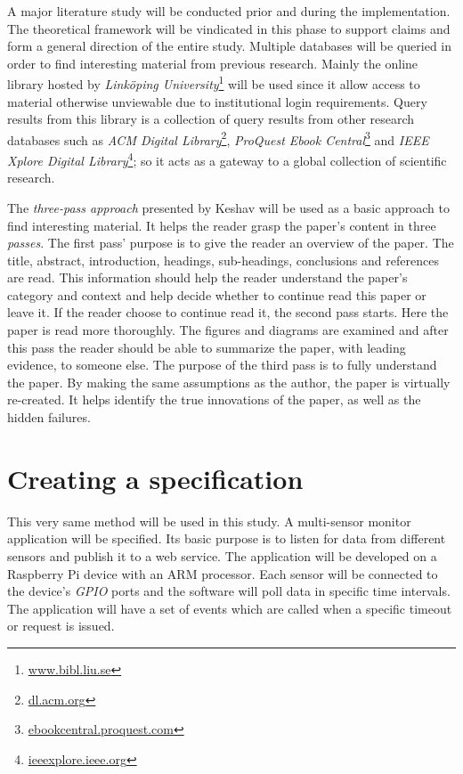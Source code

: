 A major literature study will be conducted prior and during the implementation.
The theoretical framework will be vindicated in this phase to support claims
and form a general direction of the entire study. Multiple databases will be
queried in order to find interesting material from previous research. Mainly
the online library hosted by \textit{Linköping
University}\footnote{\url{www.bibl.liu.se}} will be used since it allow access
to material otherwise unviewable due to institutional login requirements. Query
results from this library is a collection of query results from other research
databases such as \textit{ACM Digital Library}\footnote{\url{dl.acm.org}},
\textit{ProQuest Ebook Central}\footnote{\url{ebookcentral.proquest.com}} and
\textit{IEEE Xplore Digital Library}\footnote{\url{ieeexplore.ieee.org}}; so it
acts as a gateway to a global collection of scientific research.

The \textit{three-pass approach} presented by Keshav \cite{keshav2007read} will
be used as a basic approach to find interesting material. It helps the reader
grasp the paper's content in three \textit{passes}. The first pass' purpose is
to give the reader an overview of the paper. The title, abstract, introduction,
headings, sub-headings, conclusions and references are read. This information
should help the reader understand the paper's category and context and help
decide whether to continue read this paper or leave it. If the reader choose to
continue read it, the second pass starts. Here the paper is read more
thoroughly. The figures and diagrams are examined and after this pass the
reader should be able to summarize the paper, with leading evidence, to someone
else. The purpose of the third pass is to fully understand the paper. By making
the same assumptions as the author, the paper is virtually re-created. It helps
identify the true innovations of the paper, as well as the hidden failures.

\section{Creating a specification}

This very same method will be used in this study. A multi-sensor monitor
application will be specified. Its basic purpose is to listen for data from
different sensors and publish it to a web service. The application will be
developed on a Raspberry Pi device with an ARM processor. Each sensor will be
connected to the device's \textit{GPIO} ports and the software will poll data
in specific time intervals. The application will have a set of events which are
called when a specific timeout or request is issued.

